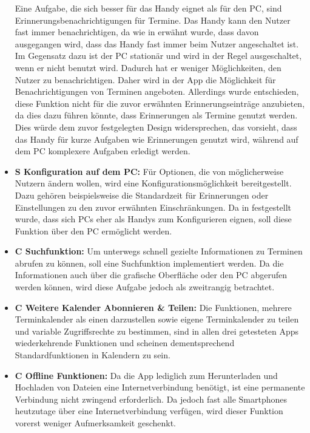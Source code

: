 \begin{itemize}
		Eine Aufgabe, die sich besser für das Handy eignet als für den PC, sind Erinnerungsbenachrichtigungen für Termine. 
			Das Handy kann den Nutzer fast immer benachrichtigen, da wie in  erwähnt wurde, dass davon ausgegangen wird, dass das Handy fast immer beim Nutzer angeschaltet ist. Im Gegensatz dazu ist der PC stationär und wird in der Regel ausgeschaltet, wenn er nicht benutzt wird. Dadurch hat er weniger Möglichkeiten, den Nutzer zu benachrichtigen.\newline%
		Daher wird in der App die Möglichkeit für Benachrichtigungen von Terminen angeboten. %
		Allerdings wurde entschieden, diese Funktion nicht für die zuvor erwähnten Erinnerungseinträge anzubieten, da dies dazu führen könnte, dass Erinnerungen als Termine genutzt werden. Dies würde dem zuvor festgelegten Design widersprechen, das vorsieht, dass das Handy für kurze Aufgaben wie Erinnerungen genutzt wird, während auf dem PC komplexere Aufgaben erledigt werden.%
	\item \textbf{S Konfiguration auf dem PC:} %
		Für Optionen, die von möglicherweise Nutzern ändern wollen, wird eine Konfigurationsmöglichkeit bereitgestellt. %
			Dazu gehören beispielsweise die Standardzeit für Erinnerungen oder Einstellungen zu den zuvor erwähnten Einschränkungen. %
		Da in  festgestellt wurde, dass sich PCs eher als Handys zum Konfigurieren eignen, soll diese Funktion über den PC ermöglicht werden.%
	\item \textbf{C Suchfunktion:} %
		Um unterwegs schnell gezielte Informationen zu Terminen abrufen zu können, soll eine Suchfunktion implementiert werden. %
		Da die Informationen auch über die grafische Oberfläche oder den PC abgerufen werden können, wird diese Aufgabe jedoch als zweitrangig betrachtet.%
	\item \textbf{C Weitere Kalender Abonnieren \& Teilen:} %
		Die Funktionen, mehrere Terminkalender als einen darzustellen sowie eigene Terminkalender zu teilen und variable Zugriffsrechte zu bestimmen, sind in allen drei getesteten Apps wiederkehrende Funktionen und scheinen dementsprechend Standardfunktionen in Kalendern zu sein. %
		
	\item \textbf{C Offline Funktionen:} %
		Da die App lediglich zum Herunterladen und Hochladen von Dateien eine Internetverbindung benötigt, ist eine permanente Verbindung nicht zwingend erforderlich. %
		Da jedoch fast alle Smartphones heutzutage über eine Internetverbindung verfügen, wird dieser Funktion vorerst weniger Aufmerksamkeit geschenkt.%


\end{itemize}
